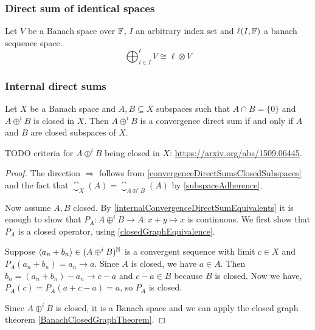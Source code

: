 \subsubsection{Direct sum of identical spaces}
\begin{proposition}
Let $V$ be a Banach space over $\mathbb{F}$, $I$ an arbitrary index set and $\ell(I,\mathbb{F})$ a banach sequence space.
\[ \bigoplus_{i\in I}^\ell V \cong \ell\otimes V \]
\end{proposition}

\subsubsection{Internal direct sums}
\begin{proposition} \label{directSumClosedSubspacesBanachSpace}
Let $X$ be a Banach space and $A,B\subseteq X$ subspaces such that $A\cap B = \{0\}$ and $A\oplus^i B$ is closed in $X$. Then $A\oplus^i B$ is a convergence direct sum \textup{if and only if} $A$ and $B$ are closed subspaces of $X$.
\end{proposition}
TODO criteria for $A\oplus^i B$ being closed in $X$: \url{https://arxiv.org/abs/1509.06445}.
\begin{proof}
The direction $\Rightarrow$ follows from \ref{convergenceDirectSumsClosedSubspaces} and the fact that $\closure_X(A) = \closure_{A\oplus^i B}(A)$ by \ref{subspaceAdherence}.

Now assume $A,B$ closed. By \ref{internalConvergenceDirectSumEquivalents} it is enough to show that $P_A: A\oplus^i B \to A: x+y \mapsto x$ is continuous. We first show that $P_A$ is a closed operator, using \ref{closedGraphEquivalence}.

Suppose $\left\langle a_n+b_n \right\rangle \in (A\oplus^i B)^{\mathbb{N}}$ is a convergent sequence with limit $c\in X$ and $P_A(a_n+b_n) = a_n \to a$. Since $A$ is closed, we have $a\in A$. Then $b_n = (a_n+b_n)- a_n \to c-a$ and $c-a\in B$ because $B$ is closed. Now we have, $P_A(c) = P_A(a+c-a) = a$, so $P_A$ is closed.

Since $A\oplus^i B$ is closed, it is a Banach space and we can apply the closed graph theorem \ref{BanachClosedGraphTheorem}.
\end{proof}



